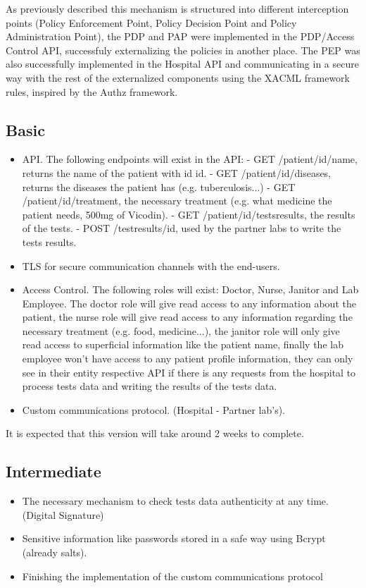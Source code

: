 As previously described this mechanism is structured into different interception points (Policy Enforcement Point, Policy Decision Point and Policy Administration Point), the PDP and PAP were implemented in the PDP/Access Control API, successfuly externalizing the policies in another place. The PEP was also successfully implemented in the Hospital API and communicating in a secure way with the rest of the externalized components using the XACML framework rules, inspired by the Authz framework\cite{authz}.

\subsection{Basic}
\begin{itemize}
	\item API.
		\subitem The following endpoints will exist in the API:
		\subitem - GET /patient/{id}/name, returns the name of the patient with id {id}.
		\subitem - GET /patient/{id}/diseases, returns the diseases the patient has (e.g. tuberculosis...)
		\subitem - GET /patient/{id}/treatment, the necessary treatment (e.g. what medicine the patient needs, 500mg of Vicodin).
		\subitem - GET /patient/{id}/testsresults, the results of the tests.
		\subitem - POST /testresults/{id}, used by the partner labs to write the tests results.
	\item TLS for secure communication channels with the end-users.
	\item Access Control.
		\subitem The following roles will exist: Doctor, Nurse, Janitor and Lab Employee. The doctor role will give read access to any information about the patient, the nurse role will give read access to any information regarding the necessary treatment (e.g. food, medicine...), the janitor role will only give  read access to superficial information like the patient name, finally the lab employee won't have access to any patient profile information, they can only see in their entity respective API if there is any requests from the hospital to process tests data and writing the results of the tests data.
	\item Custom communications protocol. (Hospital - Partner lab's).
\end{itemize}

It is expected that this version will take around 2 weeks to complete. 


\subsection{Intermediate}
\begin{itemize}
	\item The necessary mechanism to check tests data authenticity at any time. (Digital Signature)
	\item Sensitive information like passwords stored in a safe way using Bcrypt (already salts).
	\item Finishing the implementation of the custom communications protocol
\end{itemize}

